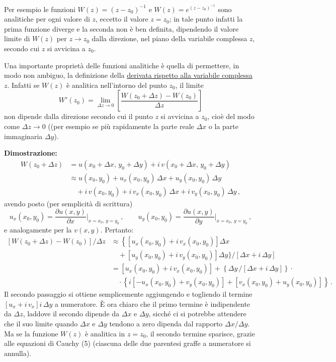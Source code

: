 \documentclass[11pt, a4paper]{book}
\numberwithin{equation}{section}
\begin{document}
Per esempio le funzioni $W(z) = (z - z_0)^{-1}$ e $W(z) = e^{(z-z_0)^{-1}}$ sono analitiche per ogni valore di $z$, eccetto il valore $z = z_0$; in tale punto infatti la prima funzione diverge e la seconda non è ben definita, dipendendo il valore limite di $W(z)$ per $z \to z_0$ dalla direzione, nel piano della variabile complessa $z$, secondo cui $z$ si avvicina a $z_0$.

Una importante proprietà delle funzioni analitiche è quella di permettere, in modo non ambiguo, la definizione della \uline{derivata rispetto alla variabile complessa $z$}. Infatti se $W(z)$ è analitica nell'intorno del punto $z_0$, il limite
\begin{equation}
W'(z_0) = \lim_{\Delta z \to 0}\left[\frac{W(z_0 + \Delta z) - W(z_0)}{\Delta z}\right] \tag{7}
\end{equation}
non dipende dalla direzione secondo cui il punto $z$ si avvicina a $z_0$, cioè del modo come $\Delta z \to 0$ ((per esempio se più rapidamente la parte reale $\Delta x$ o la parte immaginaria $\Delta y$).


\noindent\textbf{Dimostrazione:}
\begin{align*}
W(z_0 + \Delta z) &= u(x_0 + \Delta x,\, y_0 + \Delta y) + i\,v(x_0 + \Delta x,\, y_0 + \Delta y) \\
&\approx u(x_0, y_0) + u_x(x_0, y_0)\,\Delta x + u_y(x_0, y_0)\,\Delta y \\
&\quad + i\,v(x_0, y_0) + i\,v_x(x_0, y_0)\,\Delta x + i\,v_y(x_0, y_0)\,\Delta y\,,
\end{align*}
avendo posto (per semplicità di scrittura)
\[
u_x(x_0, y_0) = \frac{\partial u(x,y)}{\partial x}\bigg|_{x=x_0,\,y=y_0}\,, \qquad
u_y(x_0, y_0) = \frac{\partial u(x,y)}{\partial y}\bigg|_{x=x_0,\,y=y_0}\,,
\]
e analogamente per la $v(x,y)$. Pertanto:
\begin{align*}
\left[W(z_0+\Delta z) - W(z_0)\right]/\Delta z &\approx \left\{\left[u_x(x_0,y_0) + i\,v_x(x_0,y_0)\right]\Delta x\right. \\
&\quad + \left[u_y(x_0,y_0) + i\,v_y(x_0,y_0)\right]\Delta y\Big\}/[\Delta x + i\,\Delta y] \\
&= \left[u_x(x_0,y_0) + i\,v_x(x_0,y_0)\right] + \left\{\Delta y\,/[\Delta x + i\,\Delta y]\right\}\cdot \\
&\quad \cdot\left\{i\left[-u_x(x_0,y_0) + v_y(x_0,y_0)\right] + \left[v_x(x_0,y_0) + u_y(x_0,y_0)\right]\right\}\,.
\end{align*}
Il secondo passaggio si ottiene semplicemente aggiungendo e togliendo il termine $\left[u_x + i\,v_x\right]i\,\Delta y$ a numeratore. È ora chiaro che il primo termine è indipendente da $\Delta z$, laddove il secondo dipende da $\Delta x$ e $\Delta y$, sicché ci si potrebbe attendere che il suo limite quando $\Delta x$ e $\Delta y$ tendono a zero dipenda dal rapporto $\Delta x/\Delta y$. Ma se la funzione $W(z)$ è analitica in $z = z_0$, il secondo termine sparisce, grazie alle equazioni di Cauchy (5) (ciascuna delle due parentesi graffe a numeratore si annulla).
\end{document}
